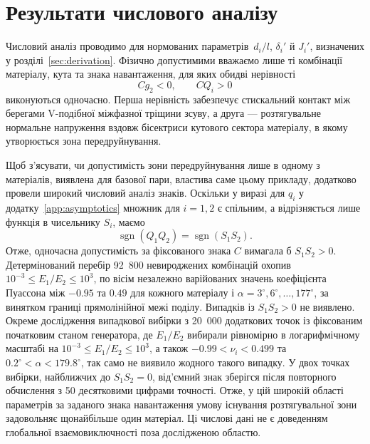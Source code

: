\section{Результати числового аналізу}
\label{sec:numerical-results}

Числовий аналіз проводимо для нормованих параметрів $\,d_i/l$, $\delta_i'$ й $J_i'$, визначених у розділі~\ref{sec:derivation}. Фізично допустимими вважаємо лише ті комбінації матеріалу, кута та знака навантаження, для яких обидві нерівності
\begin{equation*}
  Cg_2<0,\qquad CQ_i>0
\end{equation*}
виконуються одночасно. Перша нерівність забезпечує стискальний контакт між берегами V-подібної міжфазної тріщини зсуву, а друга — розтягувальне нормальне напруження вздовж бісектриси кутового сектора матеріалу, в якому утворюється зона передруйнування.

Щоб з’ясувати, чи допустимість зони передруйнування лише в одному з матеріалів, виявлена для базової пари, властива саме цьому прикладу, додатково провели широкий числовий аналіз знаків. Оскільки у виразі для $q_i$ у додатку~\ref{app:asymptotics} множник для $i=1,2$ є спільним, а відрізняється лише функція в чисельнику $S_i$, маємо
\begin{equation*}
  \operatorname{sgn}(Q_1Q_2)
  =\operatorname{sgn}(S_1S_2).
\end{equation*}
Отже, одночасна допустимість за фіксованого знака $C$ вимагала б $S_1S_2>0$. Детермінований перебір 92~800 невироджених комбінацій охопив $10^{-3}\le E_1/E_2\le10^3$, по вісім незалежно варійованих значень коефіцієнта Пуассона між $-0.95$ та $0.49$ для кожного матеріалу і $\alpha=3^\circ,6^\circ,\ldots,177^\circ$, за винятком границі прямолінійної межі поділу. Випадків із $S_1S_2>0$ не виявлено. Окреме дослідження випадкової вибірки з 20~000 додаткових точок із фіксованим початковим станом генератора, де $E_1/E_2$ вибирали рівномірно в логарифмічному масштабі на $10^{-3}\le E_1/E_2\le10^3$, а також $-0.99<\nu_i<0.499$ та $0.2^\circ<\alpha<179.8^\circ$, так само не виявило жодного такого випадку. У двох точках вибірки, найближчих до $S_1S_2=0$, від’ємний знак зберігся після повторного обчислення з 50 десятковими цифрами точності. Отже, у цій широкій області параметрів за заданого знака навантаження умову існування розтягувальної зони задовольняє щонайбільше один матеріал. Ці числові дані не є доведенням глобальної взаємовиключності поза дослідженою областю.

